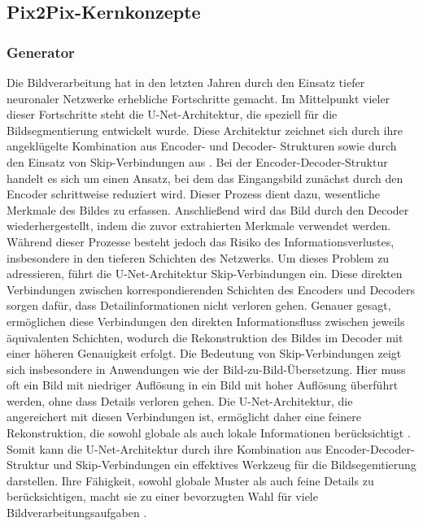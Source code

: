 \subsection{Pix2Pix-Kernkonzepte}
\subsubsection{Generator}
Die Bildverarbeitung hat in den letzten Jahren durch den Einsatz tiefer neuronaler Netzwerke erhebliche Fortschritte gemacht. Im Mittelpunkt vieler dieser Fortschritte steht die U-Net-Architektur, die speziell für die Bildsegmentierung entwickelt wurde. Diese Architektur zeichnet sich durch ihre angeklügelte Kombination aus Encoder- und Decoder- Strukturen sowie durch den Einsatz von Skip-Verbindungen aus \cite{PhillipIsola.}. 
 \newline
Bei der Encoder-Decoder-Struktur handelt es sich um einen Ansatz, bei dem das Eingangsbild zunächst durch den Encoder schrittweise reduziert wird. Dieser Prozess dient dazu, wesentliche Merkmale des Bildes zu erfassen. Anschließend wird das Bild durch den Decoder wiederhergestellt, indem die zuvor extrahierten Merkmale verwendet werden. Während dieser Prozesse besteht jedoch das Risiko des Informationsverlustes, insbesondere in den tieferen Schichten des Netzwerks.
Um dieses Problem zu adressieren, führt die U-Net-Architektur Skip-Verbindungen ein. Diese direkten Verbindungen zwischen korrespondierenden Schichten des Encoders und Decoders sorgen dafür, dass Detailinformationen nicht verloren gehen. Genauer gesagt, ermöglichen diese Verbindungen den direkten Informationsfluss zwischen jeweils äquivalenten Schichten, wodurch die Rekonstruktion des Bildes im Decoder mit einer höheren Genauigkeit erfolgt\cite{PhillipIsola.}. \newline
Die Bedeutung von Skip-Verbindungen zeigt sich insbesondere in Anwendungen wie der Bild-zu-Bild-Übersetzung. Hier muss oft ein Bild mit niedriger Auflösung in ein Bild mit hoher Auflösung überführt werden, ohne dass Details verloren gehen. Die U-Net-Architektur, die angereichert mit diesen Verbindungen ist, ermöglicht daher eine feinere Rekonstruktion, die sowohl globale als auch lokale Informationen berücksichtigt \cite{PhillipIsola.}.  \newline
Somit kann die U-Net-Architektur durch ihre Kombination aus Encoder-Decoder-Struktur und Skip-Verbindungen ein effektives Werkzeug für die Bildsegemtierung darstellen. Ihre Fähigkeit, sowohl globale Muster als auch feine Details zu berücksichtigen, macht sie zu einer bevorzugten Wahl für viele Bildverarbeitungsaufgaben \cite{PhillipIsola.}. \newline
